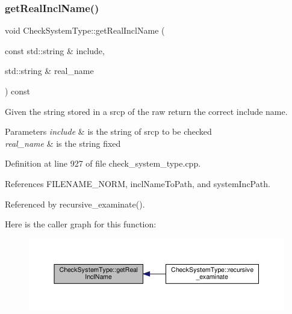 \subsubsection{\texorpdfstring{get\+Real\+Incl\+Name()}{getRealInclName()}}
{\footnotesize\ttfamily void Check\+System\+Type\+::get\+Real\+Incl\+Name (\begin{DoxyParamCaption}\item[{const std\+::string \&}]{include,  }\item[{std\+::string \&}]{real\+\_\+name }\end{DoxyParamCaption}) const\hspace{0.3cm}{\ttfamily [private]}}



Given the string stored in a srcp of the raw return the correct include name. 


\begin{DoxyParams}{Parameters}
{\em include} & is the string of srcp to be checked \\
\hline
{\em real\+\_\+name} & is the string fixed \\
\hline
\end{DoxyParams}


Definition at line 927 of file check\+\_\+system\+\_\+type.\+cpp.



References F\+I\+L\+E\+N\+A\+M\+E\+\_\+\+N\+O\+RM, incl\+Name\+To\+Path, and system\+Inc\+Path.



Referenced by recursive\+\_\+examinate().

Here is the caller graph for this function\+:
\nopagebreak
\begin{figure}[H]
\begin{center}
\leavevmode
\includegraphics[width=350pt]{d9/df6/classCheckSystemType_a8797397119d638dd0002102672096343_icgraph}
\end{center}
\end{figure}
\mbox{\label{classCheckSystemType_a0e9660fbad92ffdc163cae8d108df86c}} 
